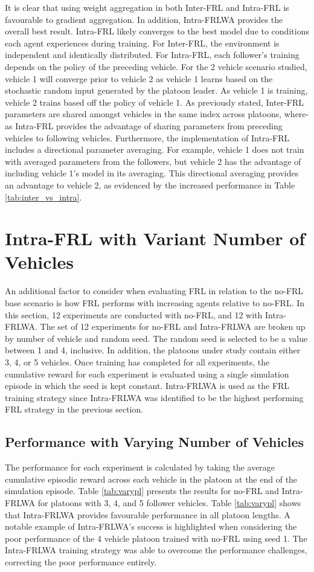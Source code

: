 It is clear that using weight aggregation in both Inter-FRL and Intra-FRL is favourable
to gradient aggregation.  In addition, Intra-FRLWA provides the overall best result.
Intra-FRL likely converges to the best model due to conditions each agent experiences
during training.  For Inter-FRL, the environment is independent and identically
distributed. For Intra-FRL, each follower's training depends on the policy of the
preceding vehicle.  For the 2 vehicle scenario studied, vehicle 1 will converge prior
to vehicle 2 as vehicle 1 learns based on the stochastic random input generated by
the platoon leader. As vehicle 1 is training, vehicle 2 trains based off the policy
of vehicle 1. As previously stated, Inter-FRL parameters are shared amongst vehicles
in the same index across platoons, where-as Intra-FRL provides the advantage of
sharing parameters from preceding vehicles to following vehicles. Furthermore, the implementation
of Intra-FRL includes a directional parameter averaging.  For example, vehicle 1 does
not train with averaged parameters from the followers, but vehicle 2 has the advantage
of including vehicle 1's model in its averaging.  This directional averaging provides
an advantage to vehicle 2, as evidenced by the increased performance in Table
\ref{tab:inter_vs_intra}.

\section{Intra-FRL with Variant Number of Vehicles}
An additional factor to consider when evaluating FRL in relation to the no-FRL base
scenario is how FRL performs with increasing agents relative to no-FRL.  In this section,
12 experiments are conducted with no-FRL, and 12 with Intra-FRLWA. The set of 12
experiments for no-FRL and Intra-FRLWA are broken up by number of vehicle and random
seed.  The random seed is selected to be a value between 1 and 4, inclusive. In addition,
the platoons under study contain either 3, 4, or 5 vehicles. Once training has completed
for all experiments, the cumulative reward for each experiment is evaluated using a single
simulation episode in which the seed is kept constant.  Intra-FRLWA is used as the FRL
training strategy since Intra-FRLWA was identified to be the highest performing FRL
strategy in the previous section.

\subsection{Performance with Varying Number of Vehicles}
The performance for each experiment is calculated by taking the average cumulative episodic
reward across each vehicle in the platoon at the end of the simulation episode.  Table
\ref{tab:varypl} presents the results for no-FRL and Intra-FRLWA for platoons with 3, 4,
and 5 follower vehicles. Table \ref{tab:varypl} shows that Intra-FRLWA provides
favourable performance in all platoon lengths. A notable example of Intra-FRLWA's success
is highlighted when considering the poor performance of the 4 vehicle platoon trained with
no-FRL using seed 1. The Intra-FRLWA training strategy was able to overcome the performance
challenges, correcting the poor performance entirely.

